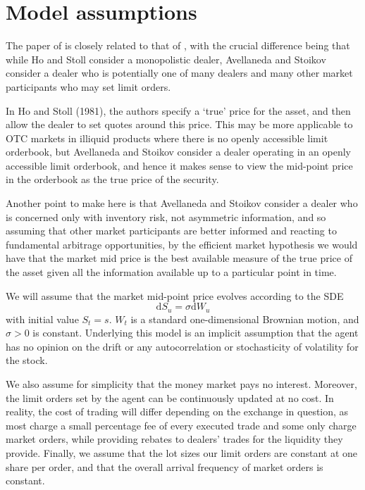 \section{Model assumptions}\label{sec:3.2}

The paper of \cite{AS2008} is closely related to that of \cite{HS1981}, with the 
crucial difference being that while Ho and Stoll consider a monopolistic dealer,
Avellaneda and Stoikov consider a dealer who is potentially one of many dealers 
and many other market participants who may set limit orders. 

In Ho and Stoll (1981),
the authors specify a `true' price for the asset, and then allow the dealer to set 
quotes around this price. This may be more applicable to OTC markets in illiquid 
products where there is no openly accessible limit orderbook, but Avellaneda and Stoikov
consider a dealer operating in an openly accessible limit orderbook, and hence it makes
sense to view the mid-point price in the orderbook as the true price of the security. 

Another point to make here is that Avellaneda and Stoikov consider a dealer who is 
concerned only with inventory risk, not asymmetric information, and so assuming that
other market participants are better informed and reacting to fundamental arbitrage
opportunities, by the efficient market hypothesis we would have that the market mid
price is the best available measure of the true price of the asset given all the information
available up to a particular point in time.

We will assume that the market mid-point price evolves according to the SDE
\begin{equation}
    \mathrm dS_u=\sigma\mathrm dW_u
\end{equation}
with initial value $S_t=s$. $W_t$ is a standard one-dimensional Brownian motion, and
$\sigma>0$ is constant. Underlying this model is an implicit assumption that the agent
has no opinion on the drift or any autocorrelation or stochasticity of volatility 
for the stock. 

We also assume for simplicity that the money market pays no interest. Moreover, the
limit orders set by the agent can be continuously updated at no cost. In reality, 
the cost of trading will differ depending on the exchange in question, as most
charge a small percentage fee of every executed trade and some only charge market orders,
while providing rebates to dealers' trades for the liquidity they provide. Finally,
we assume that the lot sizes our limit orders are constant at one share per order,
and that the overall arrival frequency of market orders is constant.

